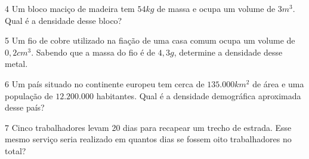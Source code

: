 


\bigskip

\num{4} Um bloco maciço de madeira tem $54 kg$ de massa e ocupa um volume de $3
m^3$. Qual é a densidade desse bloco?

\bigskip





\bigskip

\num{5} Um fio de cobre utilizado na fiação de uma casa comum ocupa um volume
de $0,2 cm^3$. Sabendo que a massa do fio é de $4,3 g$, determine a densidade
desse metal.




\pagebreak

\num{6} Um país situado no continente europeu tem cerca de $135.000 km^2$ de
área e uma população de $12.200.000$ habitantes. Qual é a densidade
demográfica aproximada desse país?

\bigskip







\bigskip

\num{7} Cinco trabalhadores levam 20 dias para recapear um trecho de estrada. Esse
mesmo serviço seria realizado em quantos dias se fossem oito trabalhadores no
total?

\bigskip



